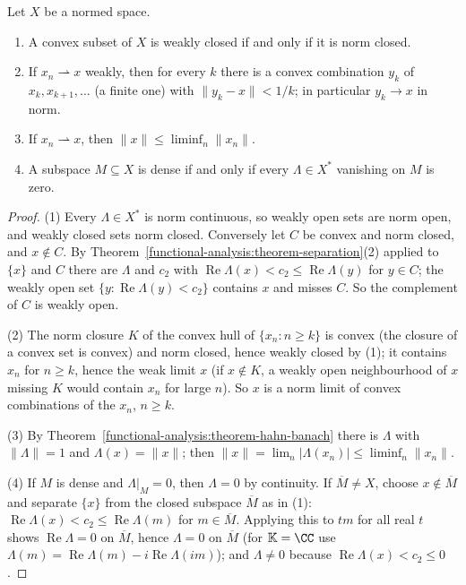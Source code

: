 \begin{corollary}[Mazur]\label{functional-analysis:corollary-mazur}
Let $X$ be a normed space.
\begin{enumerate}
\item A convex subset of $X$ is weakly closed if and only if it is norm closed.
\item If $x_n \rightharpoonup x$ weakly, then for every $k$ there is a convex combination $y_k$ of $x_k, x_{k+1}, \ldots$ (a finite one) with $\|y_k - x\| < 1/k$; in particular $y_k \to x$ in norm.
\item If $x_n \rightharpoonup x$, then $\|x\| \leq \liminf_n\|x_n\|$.
\item A subspace $M \subseteq X$ is dense if and only if every $\Lambda \in X^*$ vanishing on $M$ is zero.
\end{enumerate}
\end{corollary}

\begin{proof}
(1) Every $\Lambda \in X^*$ is norm continuous, so weakly open sets are norm open, and weakly closed sets norm closed. Conversely let $C$ be convex and norm closed, and $x \notin C$. By
Theorem~\ref{functional-analysis:theorem-separation}(2) applied to $\{x\}$ and $C$ there are $\Lambda$ and $c_2$ with $\operatorname{Re}\Lambda(x) < c_2 \leq \operatorname{Re}\Lambda(y)$ for $y \in C$; the weakly open set
$\{y : \operatorname{Re}\Lambda(y) < c_2\}$ contains $x$ and misses $C$. So the complement of $C$ is weakly open.

(2) The norm closure $K$ of the convex hull of $\{x_n : n \geq k\}$ is convex (the closure of a convex set is convex) and norm closed, hence weakly closed by (1); it contains $x_n$ for $n \geq k$, hence the weak
limit $x$ (if $x \notin K$, a weakly open neighbourhood of $x$ missing $K$ would contain $x_n$ for large $n$). So $x$ is a norm limit of convex combinations of the $x_n$, $n \geq k$.

(3) By Theorem~\ref{functional-analysis:theorem-hahn-banach} there is $\Lambda$ with $\|\Lambda\| = 1$ and $\Lambda(x) = \|x\|$; then $\|x\| = \lim_n|\Lambda(x_n)| \leq \liminf_n\|x_n\|$.

(4) If $M$ is dense and $\Lambda|_M = 0$, then $\Lambda = 0$ by continuity. If $\overline{M} \neq X$, choose $x \notin \overline{M}$ and separate $\{x\}$ from the closed subspace $\overline{M}$ as in (1):
$\operatorname{Re}\Lambda(x) < c_2 \leq \operatorname{Re}\Lambda(m)$ for $m \in \overline{M}$. Applying this to $tm$ for all real $t$ shows $\operatorname{Re}\Lambda = 0$ on $\overline{M}$, hence $\Lambda = 0$ on $\overline{M}$ (for
$\mathbb{K} = \CC$ use $\Lambda(m) = \operatorname{Re}\Lambda(m) - i\operatorname{Re}\Lambda(im)$); and $\Lambda \neq 0$ because $\operatorname{Re}\Lambda(x) < c_2 \leq 0$.
\end{proof}

